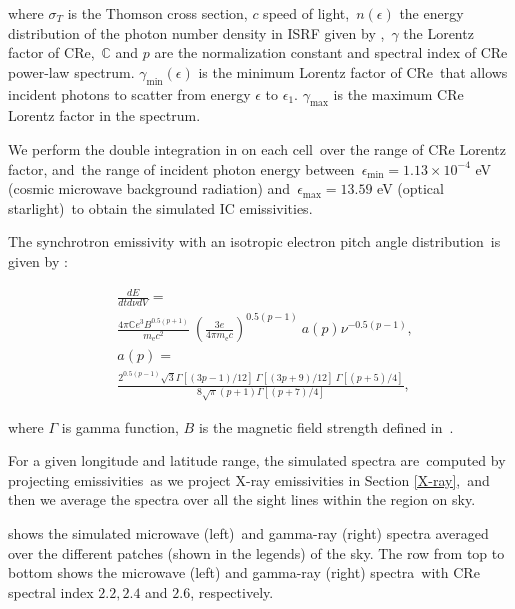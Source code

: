 \documentclass[twocolumn]{aastex631}
\begin{document}
where $\sigma_{T}$ is the Thomson cross section, $c$ speed of light,\
$n(\epsilon)$ the energy distribution of the photon number density in ISRF given by \citet{Porter2017},\
$\gamma$ the Lorentz factor of CRe,\
$\mathbb{C}$ and $p$ are the normalization constant and spectral index of CRe power-law spectrum.
$\gamma_{\text{min}}(\epsilon)$ is the minimum Lorentz factor of CRe\
that allows incident photons to scatter from energy $\epsilon$ to $\epsilon_{1}$.
$\gamma_{\text{max}}$ is the maximum CRe Lorentz factor in the spectrum.

We perform the double integration in \Cref{gammaray-emissivity} on each cell\
over the range of CRe Lorentz factor, and\
the range of incident photon energy between\
$\epsilon_{\text{min}}=1.13\times10^{-4}$ eV (cosmic microwave background radiation) and\
$\epsilon_{\text{max}}=13.59$ eV (optical starlight)\
to obtain the simulated IC emissivities.


The synchrotron emissivity with an isotropic electron pitch angle distribution\
is given by \citet{BLUMENTHAL1970}:

\begin{subequations}
   \begin{align}
      &\frac{dE}{dtd\nu dV} =\nonumber\\
      &\frac{4\pi\mathbb{C}e^{3}B^{0.5(p+1)}}{m_{\text{e}}c^{2}}\
      \left(\frac{3e}{4\pi m_{\text{e}}c}\right)^{0.5(p-1)}\
      a(p)\nu^{-0.5(p-1)},\\
      &a(p)=\nonumber\\
           &\frac{2^{0.5(p-1)}\sqrt{3}\Gamma\left[\left(3p-1\right)/12\right]\
                                      \Gamma\left[\left(3p+9\right)/12\right]\
                                      \Gamma\left[\left(p+5\right)/4\right]}
      {8\sqrt{\pi}(p+1)\Gamma\left[\left(p+7\right)/4\right]},
   \end{align}
   \label{synchrotron-emissivity}
\end{subequations}

where $\Gamma$ is gamma function, $B$ is the magnetic field strength defined in\
.

For a given longitude and latitude range, the simulated spectra are\
computed by projecting emissivities\
as we project X-ray emissivities in Section \ref{X-ray},\
and then we average the spectra over all the sight lines within the region on sky.


 shows the simulated microwave (left)\
and gamma-ray (right) spectra averaged over the different patches (shown in the legends) of the sky.
The row from top to bottom shows the microwave (left) and gamma-ray (right) spectra\
with CRe spectral index $2.2, 2.4$ and $2.6$, respectively.\
\end{document}
